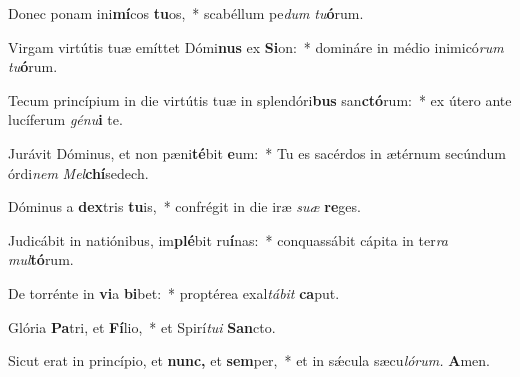 \item Donec ponam ini\textbf{mí}cos \textbf{tu}os,~* scabéllum pe\hspace*{0.02em}\textit{dum} \textit{tu}\textbf{ó}rum.
\item Virgam virtútis tuæ emíttet Dómi\textbf{nus} ex \textbf{Si}on:~* domináre in médio inimicó\textit{rum} \textit{tu}\textbf{ó}rum.
\item Tecum princípium in die virtútis tuæ in splendóri\textbf{bus} san\textbf{ctó}rum:~* ex útero ante lucíferum \textit{génu}\textbf{i} te.
\item Jurávit Dóminus, et non pæni\textbf{té}bit \textbf{e}um:~* Tu es sacérdos in ætérnum secúndum órdi\textit{nem} \textit{Mel}\textbf{chí}sedech.
\item Dóminus a \textbf{dex}tris \textbf{tu}is,~* confrégit in die iræ \textit{suæ} \textbf{re}ges.
\item Judicábit in natiónibus, im\textbf{plé}bit ru\textbf{í}nas:~* conquassábit cápita in ter\textit{ra} \textit{mul}\hspace*{-0.01em}\textbf{tó}rum.
\item De torrénte in \textbf{vi}a \textbf{bi}bet:~* proptérea exal\textit{tábit} \textbf{ca}put.
\item Glória \textbf{Pa}tri, et \textbf{Fí}lio,~* et Spirí\tinyhspace\textit{tui} \textbf{San}cto.
\item Sicut erat in princípio, et \textbf{nunc,} et \textbf{sem}per,~* et in sǽcula sæcu\tinyhspace\textit{lórum.} \textbf{A}men.